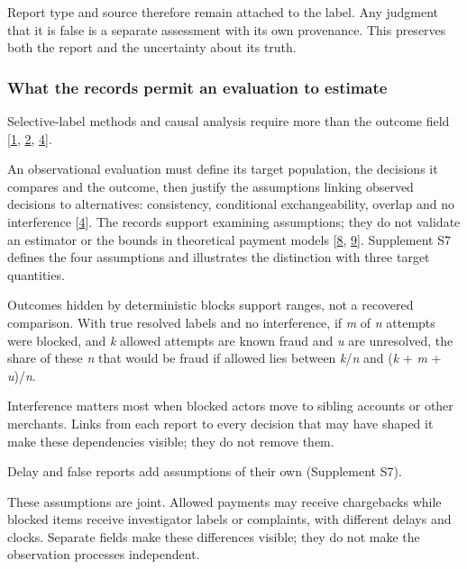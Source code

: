 \documentclass[acmlarge,review,anonymous,nonacm]{acmart}
\begin{document}
Report type and source therefore remain attached to the label. Any
judgment that it is false is a separate assessment with its own
provenance. This preserves both the report and the uncertainty about its
truth.

\hypertarget{what-the-records-permit-an-evaluation-to-estimate}{%
\subsubsection*{What the records permit an evaluation to
estimate}\label{what-the-records-permit-an-evaluation-to-estimate}}

Selective-label methods and causal analysis require more than the
outcome field {[}\protect\hyperlink{ref-Lakkaraju2017Selective}{1},
\protect\hyperlink{ref-Kilbertus2020Fair}{2},
\protect\hyperlink{ref-HernanRobins2020}{4}{]}.

An observational evaluation must define its target population, the
decisions it compares and the outcome, then justify the assumptions
linking observed decisions to alternatives: consistency, conditional
exchangeability, overlap and no interference
{[}\protect\hyperlink{ref-HernanRobins2020}{4}{]}. The records support
examining assumptions; they do not validate an estimator or the bounds
in theoretical payment models
{[}\protect\hyperlink{ref-Dhama2026Causal}{8},
\protect\hyperlink{ref-Dhama2026Limits}{9}{]}. Supplement S7 defines the
four assumptions and illustrates the distinction with three target
quantities.

Outcomes hidden by deterministic blocks support ranges, not a recovered
comparison. With true resolved labels and no interference, if \emph{m}
of \emph{n} attempts were blocked, and \emph{k} allowed attempts are
known fraud and \emph{u} are unresolved, the share of these \emph{n}
that would be fraud if allowed lies between \emph{k}/\emph{n} and
(\emph{k} + \emph{m} + \emph{u})/\emph{n}.

Interference matters most when blocked actors move to sibling accounts
or other merchants. Links from each report to every decision that may
have shaped it make these dependencies visible; they do not remove them.

Delay and false reports add assumptions of their own (Supplement S7).

These assumptions are joint. Allowed payments may receive chargebacks
while blocked items receive investigator labels or complaints, with
different delays and clocks. Separate fields make these differences
visible; they do not make the observation processes independent.
\end{document}
